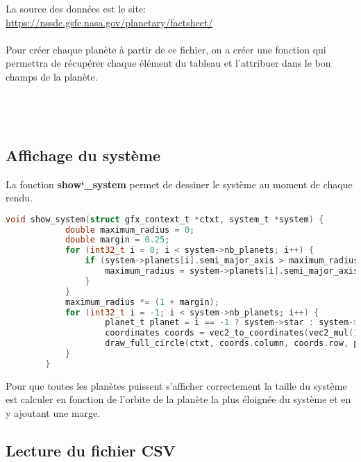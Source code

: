 \documentclass[a4paper,10pt]{article}
\begin{document}
    La source des données est le site: \href{https://nssdc.gsfc.nasa.gov/planetary/factsheet/}{https://nssdc.gsfc.nasa.gov/planetary/factsheet/} \\\\
    
    Pour créer chaque planète à partir de ce fichier, on a créer une fonction qui permettra de récupérer chaque élément du tableau et l'attribuer dans le bon champs de la planète.\\\\\\\\
    
    
    \subsection{Affichage du système}\label{subsec:affichage-du-système}

    La fonction \textbf{show\char`_system} permet de dessiner le système au moment de chaque rendu.

    \begin{lstlisting}[language=c,label={lst:lstlisting8}]
        void show_system(struct gfx_context_t *ctxt, system_t *system) {
            double maximum_radius = 0;
            double margin = 0.25;
            for (int32_t i = 0; i < system->nb_planets; i++) {
                if (system->planets[i].semi_major_axis > maximum_radius) {
                    maximum_radius = system->planets[i].semi_major_axis;
                }
            }
            maximum_radius *= (1 + margin);
            for (int32_t i = -1; i < system->nb_planets; i++) {
                    planet_t planet = i == -1 ? system->star : system->planets[i];
                    coordinates coords = vec2_to_coordinates(vec2_mul(1.0 / maximum_radius, planet.pos), SCREEN_WIDTH, SCREEN_HEIGHT);
                    draw_full_circle(ctxt, coords.column, coords.row, planet.radius, planet.color);
            }
        }
    \end{lstlisting}

    Pour que toutes les planètes puissent s'afficher correctement la taille du système est calculer en fonction de l'orbite de la planète la plus éloignée du système et en y ajoutant une marge.

    \subsection{Lecture du fichier CSV}\label{subsec:lecture-du-fichier-csv}
\end{document}
